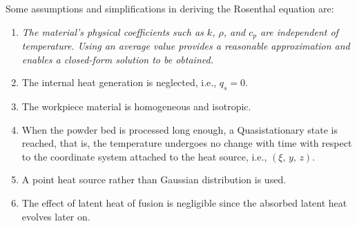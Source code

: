 \documentclass [11pt, proquest] {uwthesis}[2020/02/24]
\begin{document}
Some assumptions and simplifications in deriving the Rosenthal equation
are:
\begin{enumerate}
\item \emph{The material\textquoteright s physical coefficients such as
$k$, $\rho$, and $c_{p}$ are independent of temperature. Using
an average value provides a reasonable approximation and enables a
closed-form solution to be obtained.}
\item The internal heat generation is neglected, i.e., $q_{s}=0$. 
\item The workpiece material is homogeneous and isotropic.
\item When the powder bed is processed long enough, a Quasistationary state
is reached, that is, the temperature undergoes no change with time
with respect to the coordinate system attached to the heat source,
i.e., $(\xi,\,y,\,z)$.
\item A point heat source rather than Gaussian distribution is used.
\item The effect of latent heat of fusion is negligible since the absorbed
latent heat evolves later on.
\end{enumerate}
\end{document}
